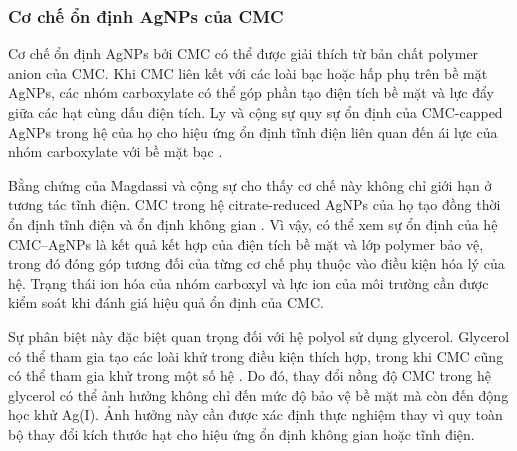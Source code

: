 \subsubsection{Cơ chế ổn định AgNPs của CMC}
Cơ chế ổn định AgNPs bởi CMC có thể được giải thích từ bản chất polymer anion của CMC.
Khi CMC liên kết với các loài bạc hoặc hấp phụ trên bề mặt AgNPs, các nhóm carboxylate có thể góp phần tạo điện tích bề mặt và lực đẩy giữa các hạt cùng dấu điện tích.
Ly và cộng sự quy sự ổn định của CMC-capped AgNPs trong hệ của họ cho hiệu ứng ổn định tĩnh điện liên quan đến ái lực của nhóm carboxylate với bề mặt bạc \parencite{ly2024}.
\par
Bằng chứng của Magdassi và cộng sự cho thấy cơ chế này không chỉ giới hạn ở tương tác tĩnh điện.
CMC trong hệ citrate-reduced AgNPs của họ tạo đồng thời ổn định tĩnh điện và ổn định không gian \parencite{magdassi2003}.
Vì vậy, có thể xem sự ổn định của hệ CMC--AgNPs là kết quả kết hợp của điện tích bề mặt và lớp polymer bảo vệ, trong đó đóng góp tương đối của từng cơ chế phụ thuộc vào điều kiện hóa lý của hệ.
Trạng thái ion hóa của nhóm carboxyl và lực ion của môi trường cần được kiểm soát khi đánh giá hiệu quả ổn định của CMC.
\par
Sự phân biệt này đặc biệt quan trọng đối với hệ polyol sử dụng glycerol.
Glycerol có thể tham gia tạo các loài khử trong điều kiện thích hợp, trong khi CMC cũng có thể tham gia khử trong một số hệ \parencite{liu2020glycerol,ly2024}.
Do đó, thay đổi nồng độ CMC trong hệ glycerol có thể ảnh hưởng không chỉ đến mức độ bảo vệ bề mặt mà còn đến động học khử Ag(I).
Ảnh hưởng này cần được xác định thực nghiệm thay vì quy toàn bộ thay đổi kích thước hạt cho hiệu ứng ổn định không gian hoặc tĩnh điện.
